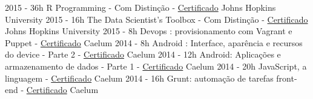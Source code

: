 \begin{entrylistii}
  \entryii
    {2015 - 36h}
    {R Programming - Com Distinção - \href{https://www.coursera.org/account/accomplishments/records/p3u7HG52CSE2qRGP}{Certificado}}
    {Johns Hopkins University}
  \entryii
    {2015 - 16h}
    {The Data Scientist’s Toolbox - Com Distinção - \href{https://www.coursera.org/account/accomplishments/records/EqAPAr2dEYeBbBSB}{Certificado}}
    {Johns Hopkins University}
  \entryii
    {2015 - 8h}
    {Devops : provisionamento com Vagrant e Puppet - \href{https://www.alura.com.br/user/3311/fullCertificate/bdd8817990ef209f0fb6b049f2d2ea0c}{Certificado}}
    {Caelum}
  \entryii
    {2014 - 8h}
    {Android : Interface, aparência e recursos do device - Parte 2 - \href{https://www.alura.com.br/user/3311/fullCertificate/bdd8817990ef209f0fb6b049f2d2ea0c}{Certificado}}
    {Caelum}
  \entryii
    {2014 - 12h}
    {Android: Aplicações e armazenamento de dados - Parte 1 - \href{https://www.alura.com.br/user/3311/fullCertificate/bdd8817990ef209f0fb6b049f2d2ea0c}{Certificado}}
    {Caelum}    
  \entryii
    {2014 - 20h}
    {JavaScript, a linguagem - \href{https://www.alura.com.br/user/3311/fullCertificate/bdd8817990ef209f0fb6b049f2d2ea0c}{Certificado}}
    {Caelum}
  \entryii
    {2014 - 16h}
    {Grunt: automação de tarefas front-end - \href{https://www.alura.com.br/user/3311/fullCertificate/bdd8817990ef209f0fb6b049f2d2ea0c}{Certificado}}
    {Caelum}  

\end{entrylistii}
